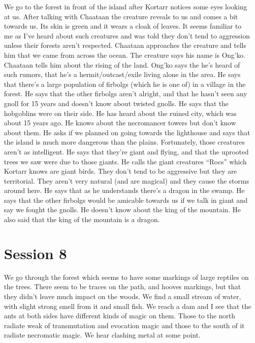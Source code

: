 \documentclass[10pt,a4paper,twoside,openany,hidelinks]{book}
\begin{document}
We go to the forest in front of the island after Kortarr notices some eyes looking at us. After talking with Chaataan the creature reveals to us and comes a bit towards us. Its skin is green and it wears a cloak of leaves. It seems familiar to me as I've heard about such creatures and was told they don't tend to aggression unless their forests aren't respected.
Chaataan approaches the creature and tells him that we came from across the ocean. The creature says his name is Ong'ko. Chaataan tells him about the rising of the land. Ong'ko says the he's heard of such rumors, that he's a hermit/outcast/exile living alone in the area. He says that there's a large population of firbolgs (which he is one of) in a village in the forest.
He says that the other firbolgs aren't alright, and that he hasn't seen any gnoll for 15 years and doesn't know about twisted gnolls. He says that the hobgoblins were on their side. He has heard about the ruined city, which was about 15 years ago. He knows about the necromancer towers but don't know about them. He asks if we planned on going towards the lighthouse and says that the island is much more dangerous than the plains. Fortunately, those creatures aren't as intelligent. He says that they're giant and flying, and that the uprooted trees we saw were due to those giants. He calls the giant creatures ``Rocs'' which Kortarr knows are giant birds. They don't tend to be aggressive but they are territorial. They aren't very natural (and are magical) and they cause the storms around here.
He says that as he understands there's a dragon in the swamp. He says that the other firbolgs would be amicable towards us if we talk in giant and say we fought the gnolls. He doesn't know about the king of the mountain. He also said that the king of the mountain is a dragon.

\chapter*{Session 8}

We go through the  forest which seems to have some markings of large reptiles on the trees. There seem to be traces on the path, and hooves markings, but that they didn't leave much impact on the woods.
We find a small stream of water, with slight strong smell from it and small fish.
We reach a dam and I see that the ants at both sides have different kinds of magic on them. Those to the north radiate weak of transmutation and evocation magic and those to the south of it radiate necromatic magic.
We hear clashing metal at some point.
\end{document}
